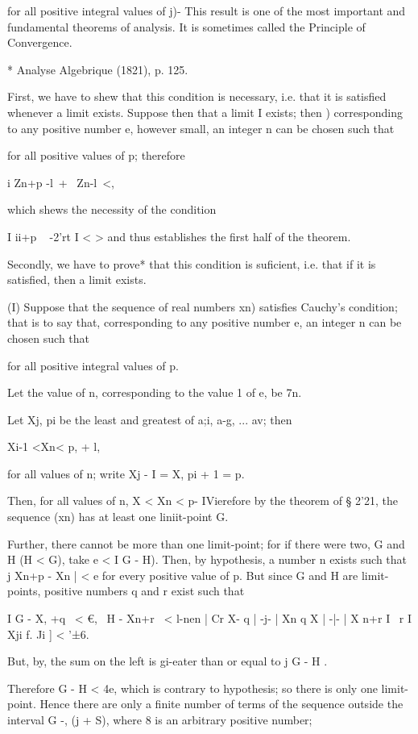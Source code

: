 for all positive integral values of j)- This result is one of the most
important and fundamental theorems of analysis. It is sometimes called
the Principle of Convergence.

* Analyse Algebrique (1821), p. 125.

%
%

First, we have to shew that this condition is necessary, i.e. that it
is satisfied whenever a limit exists. Suppose then that a limit I
exists; then ) corresponding to any positive number e, however
small, an integer n can be chosen such that

for all positive values of p; therefore

  i Zn+p -l\ + \ Zn-l\ <,

which shews the necessity of the condition

I ii+p ~ -2'rt I < > and thus establishes the first half of the
theorem.

Secondly, we have to prove* that this condition is suficient, i.e.
that if it is satisfied, then a limit exists.

(I) Suppose that the sequence of real numbers xn) satisfies Cauchy's
condition; that is to say that, corresponding to any positive number
e, an integer n can be chosen such that

for all positive integral values of p.

Let the value of n, corresponding to the value 1 of e, be 7n.

Let Xj, pi be the least and greatest of a;i, a-g, ... av; then

Xi-1 <Xn< p, + l,

for all values of n; write Xj - I = X, pi + 1 = p.

Then, for all values of n, X < Xn < p- IVierefore by the theorem of §
2'21, the sequence (xn) has at least one liniit-point G.

Further, there cannot be more than one limit-point; for if there were
two, G and H (H < G), take e < I G - H). Then, by hypothesis, a number
n exists such that j Xn+p - Xn | < e for every positive value of p.
But since G and H are limit-points, positive numbers q and r exist
such that

I G - X, +q \ < €, \ H - Xn+r \ < l-nen | Cr X- q | -j- | Xn q X | -|-
| X n+r I ~r I Xji f. Ji ] < '±6.

But, by, the sum on the left is gi-eater than or equal to j G -
H .

Therefore G - H < 4e, which is contrary to hypothesis; so there is
only one limit- point. Hence there are only a finite number of terms
of the sequence outside the interval G -, (j + S), where 8 is an
arbitrary positive number;

